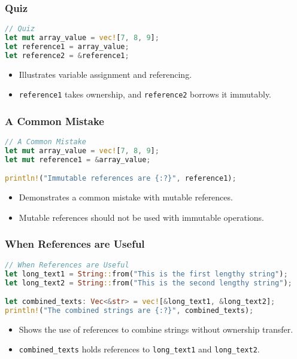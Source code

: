 \documentclass[aspectratio=169, table]{beamer}
\begin{document}
\begin{frame}[fragile]
\frametitle{Quiz}
\begin{lstlisting}[language=Rust]
// Quiz
let mut array_value = vec![7, 8, 9]; 
let reference1 = array_value;    
let reference2 = &reference1; 
\end{lstlisting}
\begin{itemize}
\item Illustrates variable assignment and referencing.
\item \texttt{reference1} takes ownership, and \texttt{reference2} borrows it immutably.
\end{itemize}
\end{frame}

\begin{frame}[fragile]
\frametitle{A Common Mistake}
\begin{lstlisting}[language=Rust]
// A Common Mistake
let mut array_value = vec![7, 8, 9]; 
let mut reference1 = &array_value; 

println!("Immutable references are {:?}", reference1); 
\end{lstlisting}
\begin{itemize}
\item Demonstrates a common mistake with mutable references.
\item Mutable references should not be used with immutable operations.
\end{itemize}
\end{frame}

\begin{frame}[fragile]
\frametitle{When References are Useful}
\begin{lstlisting}[language=Rust]
// When References are Useful
let long_text1 = String::from("This is the first lengthy string"); 
let long_text2 = String::from("This is the second lengthy string"); 

let combined_texts: Vec<&str> = vec![&long_text1, &long_text2];  
println!("The combined strings are {:?}", combined_texts);
\end{lstlisting}
\begin{itemize}
\item Shows the use of references to combine strings without ownership transfer.
\item \texttt{combined\_texts} holds references to \texttt{long\_text1} and \texttt{long\_text2}.
\end{itemize}
\end{frame}
\end{document}
